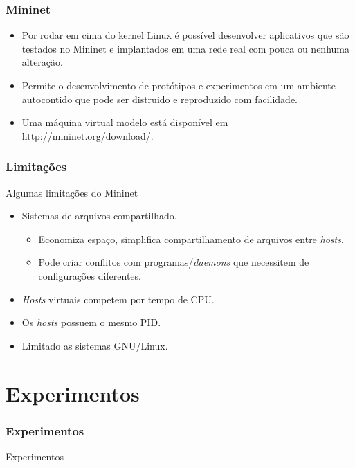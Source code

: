 \documentclass{beamer}
\begin{document}
\begin{frame}
    \frametitle{Mininet}

    \begin{itemize}
        \item Por rodar em cima do kernel Linux é possível desenvolver aplicativos que são testados no Mininet
            e implantados em uma rede real com pouca ou nenhuma alteração.
        \item Permite o desenvolvimento de protótipos e experimentos em um ambiente autocontido que pode ser
            distruido e reproduzido com facilidade.
        \item Uma máquina virtual modelo está disponível em \url{http://mininet.org/download/}.
    \end{itemize}
\end{frame}


\begin{frame}
    \frametitle{Limitações}

    Algumas limitações do Mininet

    \begin{itemize}
        \item Sistemas de arquivos compartilhado.
        \begin{itemize}
            \item Economiza espaço, simplifica compartilhamento de arquivos entre \textit{hosts}.
            \item Pode criar conflitos com programas/\textit{daemons} que necessitem de configurações diferentes.
        \end{itemize}
        \item \textit{Hosts} virtuais competem por tempo de CPU.
        \item Os \textit{hosts} possuem o mesmo PID.
        \item Limitado as sistemas GNU/Linux.
    \end{itemize}
\end{frame}

\section{Experimentos}

\begin{frame}
    \frametitle{Experimentos}

    \begin{center}
        {\huge Experimentos}
    \end{center}

\end{frame}
\end{document}
